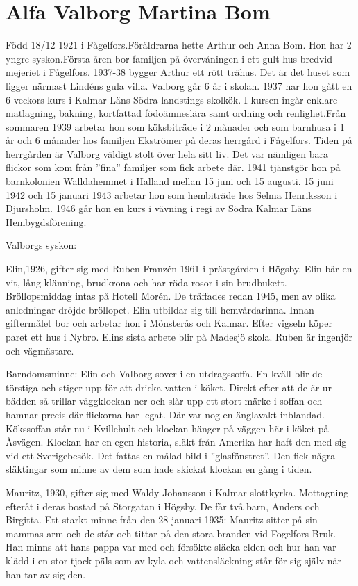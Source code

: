 \chapter{Alfa Valborg Martina Bom}
\label{alfa_valborg_martina_bom}
Född 18/12 1921 i Fågelfors.Föräldrarna hette Arthur och Anna Bom. Hon har 2 yngre syskon.Första åren bor familjen på övervåningen i ett gult hus bredvid mejeriet i Fågelfors. 1937-38 bygger Arthur ett rött trähus. Det är det huset som ligger närmast Lindéns gula villa. 
Valborg går 6 år i skolan. 1937 har hon gått en 6 veckors kurs i Kalmar Läns Södra landstings skolkök. I kursen ingår enklare matlagning, bakning, kortfattad födoämneslära samt ordning och renlighet.Från sommaren 1939 arbetar hon som köksbiträde i 2 månader och som barnhusa i 1 år och 6 månader hos familjen Ekströmer på deras herrgård i Fågelfors. Tiden på herrgården är Valborg väldigt stolt över hela sitt liv. Det var nämligen bara flickor som kom från ”fina” familjer som fick arbete där. 1941 tjänstgör hon på barnkolonien Walldahemmet i Halland mellan 15 juni och 15 augusti. 15 juni 1942 och 15 januari 1943 arbetar hon som hembiträde hos Selma Henriksson i Djursholm. 1946 går hon en kurs i vävning i regi av Södra Kalmar Läns Hembygdsförening.

Valborgs syskon:

Elin,1926, gifter sig med Ruben Franzén 1961 i prästgården i Högsby.  Elin bär en vit, lång klänning, brudkrona och har röda rosor i sin brudbukett. Bröllopsmiddag intas på Hotell Morén. De träffades redan 1945, men av olika anledningar dröjde bröllopet. Elin utbildar sig till hemvårdarinna. Innan giftermålet bor och arbetar  hon i Mönsterås och Kalmar. Efter vigseln köper paret ett hus i Nybro. Elins sista arbete blir på Madesjö skola. Ruben är ingenjör och vägmästare. 

Barndomsminne: Elin och Valborg sover i en utdragssoffa. En kväll blir de törstiga och stiger upp för att dricka vatten i köket. Direkt efter att de är ur bädden så trillar väggklockan ner och slår upp ett stort märke i soffan och hamnar precis där flickorna har legat. Där var nog en änglavakt inblandad.
Kökssoffan står nu i Kvillehult och klockan hänger på väggen här i köket på Åsvägen. Klockan har en egen historia, släkt från Amerika har haft den med sig vid ett Sverigebesök. Det fattas en målad bild i ”glasfönstret”. Den fick några släktingar som minne av dem som hade skickat klockan en gång i tiden.

Mauritz, 1930, gifter sig med Waldy Johansson i Kalmar slottkyrka. Mottagning efteråt i deras bostad på Storgatan i Högsby. De får två barn, Anders och Birgitta.
Ett starkt minne från den 28 januari 1935: Mauritz sitter på sin mammas arm och de står och tittar på den stora branden vid Fogelfors Bruk. Han minns att hans pappa var med och försökte släcka elden och hur han var klädd i en stor tjock päls som av kyla och vattensläckning står för sig själv när han tar av sig den.

